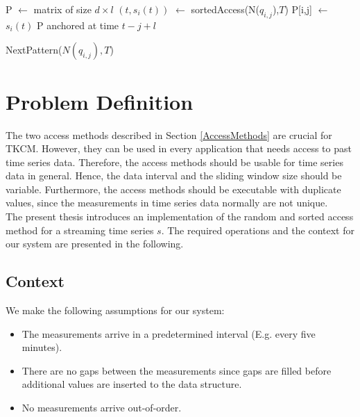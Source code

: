 \documentclass[abstracton,12pt,oneside]{scrreprt}
\begin{document}
\BlankLine
\begin{algorithm}[H]
	\IncMargin{1em}
	\SetAlgoLined
	\DontPrintSemicolon

		P $\leftarrow$ matrix of size $d\times l$\;
		$(t, s_i(t))$ $\leftarrow$ sortedAccess(N($q_{i,j}$),$T$)\; 
		P[i,j] $\leftarrow$ $s_i(t)$\;	
		{
		}
		\Return P anchored at time $t-j+l$\;
	
	
	\caption{NextPattern($N(q_{i,j}),T$)}
	\label{NextPattern}
\end{algorithm}



\chapter{Problem Definition}
\label{ProblemDefinition}
The two access methods described in Section \ref{AccessMethods} are crucial for TKCM. However, they can be used in every application that needs access to past time series data. Therefore, the access methods should be usable for time series data in general. Hence, the data interval and the sliding window size should be variable. Furthermore, the access methods should be executable with duplicate values, since the measurements in time series data normally are not unique.
\\The present thesis introduces an implementation of the random and sorted access method for a streaming time series $s$. The required operations and the context for our system are presented in the following.

\section{Context}

We make the following assumptions for our system: 
\begin{itemize}  
	\item The measurements arrive in a predetermined interval (E.g. every five minutes). 
	\item There are no gaps between the measurements since gaps are filled before additional values are inserted to the data structure.
	\item No measurements arrive out-of-order.
\end{itemize}
\end{document}
